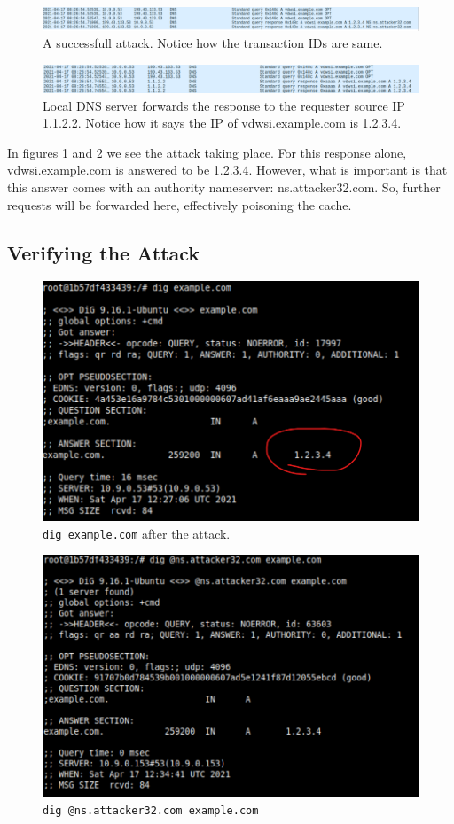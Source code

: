 \documentclass[12pt,reqno]{amsart}
\newcommand{\code}[1]{\texttt{#1}}
\begin{document}
\begin{figure}[h]
  \includegraphics[width=\linewidth]{img/attack_1.png}
  \caption{A successfull attack. Notice how the transaction IDs are same.}
  \label{fig:atk1}
\end{figure}

\begin{figure}[h]
  \includegraphics[width=\linewidth]{img/attack_2.png}
  \caption{Local DNS server forwards the response to the requester source IP 1.1.2.2. Notice how it says the IP of vdwsi.example.com is 1.2.3.4.}
  \label{fig:atk2}
\end{figure}

In figures \ref{fig:atk1} and \ref{fig:atk2} we see the attack taking place. For this response alone, vdwsi.example.com is answered to be 1.2.3.4. However, what is important is that this answer comes with an authority nameserver: ns.attacker32.com. So, further requests will be forwarded here, effectively poisoning the cache.

\subsection*{Verifying the Attack}

\begin{figure}[h]
  \includegraphics[width=0.7\linewidth]{img/ATTACK_SUCCESS.png}
  \caption{\code{dig example.com} after the attack.}
  \label{fig:vrfy1}
\end{figure}


\begin{figure}[h]
  \includegraphics[width=0.7\linewidth]{img/ATTACK_VERIFY.png}
  \caption{ \code{dig @ns.attacker32.com example.com} }
  \label{fig:vrfy2}
\end{figure}
\end{document}
